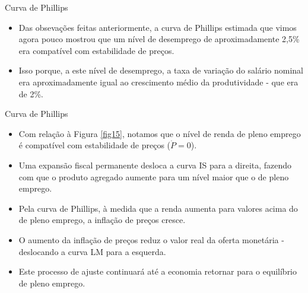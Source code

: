 \documentclass[10pt]{beamer}
\begin{document}
\begin{frame}{Curva de Phillips}
    \begin{itemize}
        \item Das obsevações feitas anteriormente, a curva de Phillips estimada que vimos agora pouco mostrou que um nível de desemprego de aproximadamente 2,5\% era compatível com estabilidade de preços.
        \bigskip
        \item Isso porque, a este nível de desemprego, a taxa de variação do salário nominal era aproximadamente igual ao crescimento médio da produtividade - que era de 2\%.
    \end{itemize}
\end{frame}

\begin{frame}{Curva de Phillips}
    \begin{itemize}
        \item Com relação à Figura \ref{fig15}, notamos que o nível de renda de pleno emprego é compatível com estabilidade de preços ($\dot{P} = 0$).
        \bigskip
        \item Uma expansão fiscal permanente desloca a curva IS para a direita, fazendo com que o produto agregado aumente para um nível maior que o de pleno emprego.
        \bigskip
        \item Pela curva de Phillips, à medida que a renda aumenta para valores acima do de pleno emprego, a inflação de preços cresce.
        \bigskip
        \item O aumento da inflação de preços reduz o valor real da oferta monetária - deslocando a curva LM para a esquerda.
        \bigskip
        \item Este processo de ajuste continuará até a economia retornar para o equilíbrio de pleno emprego.
    \end{itemize}
\end{frame}
\end{document}
